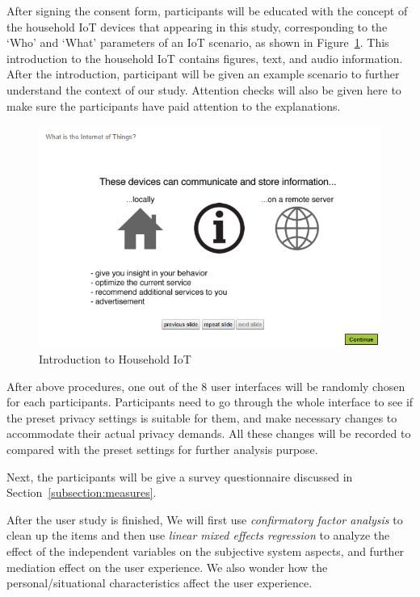 After signing the consent form, participants will be educated with the concept of the household IoT devices that appearing in this study, corresponding to the `Who' and `What' parameters of an IoT scenario, as shown in Figure~\ref{fig:us3}. This introduction to the household IoT contains figures, text, and audio information. After the introduction, participant will be given an example scenario to further understand the context of our study. Attention checks will also be given here to make sure the participants have paid attention to the explanations.
\begin{figure}
	\centering
	\includegraphics[width=\textwidth]{figures/userstudy3.png}
	\caption{Introduction to Household IoT}
	\label{fig:us3}
\end{figure}

After above procedures, one out of the 8 user interfaces will be randomly chosen for each participants. Participants need to go through the whole interface to see if the preset privacy settings is suitable for them, and make necessary changes to accommodate their actual privacy demands. All these changes will be recorded to compared with the preset settings for further analysis purpose. 

Next, the participants will be give a survey questionnaire discussed in Section~\ref{subsection:measures}.

After the user study is finished, We will first use \textit{confirmatory factor analysis} to clean up the items and then use \textit{linear mixed effects regression} to analyze the effect of the independent variables on the subjective system aspects, and further mediation effect on the user experience. We also wonder how the personal/situational characteristics affect the user experience.



